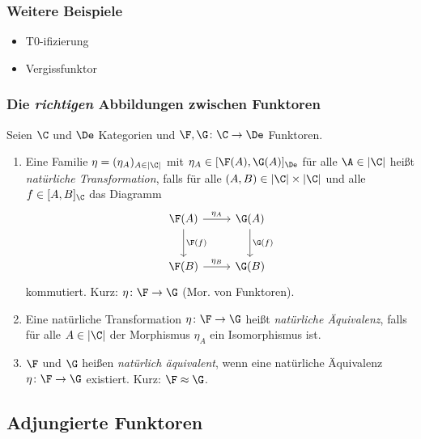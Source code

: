 \documentclass[serif,9pt]{beamer}
\begin{document}
\begin{frame}[fragile]
  \frametitle{Weitere Beispiele}
  \begin{itemize}
    \item T0-ifizierung
    \item Vergissfunktor
  \end{itemize}
\end{frame}

\begin{frame}[fragile]
  \frametitle{Die \emph{richtigen} Abbildungen zwischen Funktoren}
  Seien $\C$ und $\De$ Kategorien und $\F, \G \colon \C \to \De$ Funktoren.
  \begin{enumerate}[1)]
    \item<+-> Eine Familie $\eta = (\eta_A)_{A \in |\C|}$ mit $\eta_A \in [\F(A), \G(A)]_\De$ für alle $\A \in |\C|$ heißt \emph{natürliche Transformation}, falls für alle $(A,B) \in |\C| \times |\C|$ und alle $f \in [A,B]_\C$ das Diagramm
      $$
      \begin{tikzcd}[row sep=2.5em]
        \F(A)\arrow[r,"\eta_A"]\arrow[d,"\F(f)"] & \G(A)\arrow[d,"\G(f)"] \\
        \F(B)\arrow[r,"\eta_B"] & \G(B)
      \end{tikzcd}
      $$
      kommutiert. Kurz: $\eta \colon \F \to \G$ (Mor. von Funktoren).
    \item<+-> Eine natürliche Transformation $\eta \colon \F \to \G$ heißt \emph{natürliche Äquivalenz}, falls für alle $A \in |\C|$ der Morphismus $\eta_A$ ein Isomorphismus ist.
    \item<+-> $\F$ und $\G$ heißen \emph{natürlich äquivalent},  wenn eine natürliche Äquivalenz $\eta \colon \F \to \G$ existiert. Kurz: $\F \approx \G$.
  \end{enumerate}
\end{frame}

\subsection{Adjungierte Funktoren}
\end{document}

